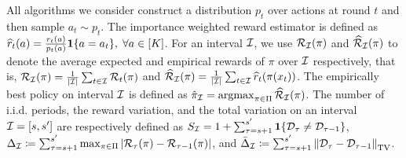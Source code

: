 
All algorithms we consider construct a distribution $p_t$ over actions
at round $t$ and then sample $a_t \sim p_t$.  The importance weighted
reward estimator is defined as $\widehat{r}_t(a) = \frac{r_t(a)}{p_t(a)}
\boldsymbol{1}\{a = a_t\},\; \forall a \in [K]$.  For an interval ${\mathcal{I}}$, we
use ${\mathcal{R}}_{\mathcal{I}}(\pi)$ and $\widehat{\cal{R}}_{\mathcal{I}}(\pi)$ to denote the average
expected and empirical rewards of $\pi$ over ${\mathcal{I}}$ respectively,
that is, ${\mathcal{R}}_{\mathcal{I}}(\pi) =
\frac{1}{|{\mathcal{I}}|}\sum_{t\in{\mathcal{I}}}{\mathcal{R}}_t(\pi)$ and $\widehat{\cal{R}}_{\mathcal{I}}(\pi) =
\frac{1}{|{\mathcal{I}}|}\sum_{t\in{\mathcal{I}}}\widehat{r}_t(\pi(x_t))$.  
The empirically best policy on interval ${\mathcal{I}}$ is defined as $\hat{\pi}_{\mathcal{I}} = \operatorname*{argmax}_{\pi\in\Pi}\widehat{\cal{R}}_{\mathcal{I}}(\pi)$.
The number of i.i.d. periods, the reward variation, and the total variation on an interval
${\mathcal{I}} = [s,s']$ are respectively defined as 
$S_{\mathcal{I}} = 1+\sum_{\tau=s+1}^{s'} \boldsymbol{1}\{{\mathcal{D}}_\tau \neq {\mathcal{D}}_{\tau-1}\}$,
$\Delta_{\mathcal{I}} \coloneqq \sum_{\tau = s+1}^{s'} \max_{\pi \in \Pi} |{\mathcal{R}}_\tau(\pi) - {\mathcal{R}}_{\tau - 1}(\pi)|$,
and $\bar{\Delta}_{\mathcal{I}} \coloneqq \sum_{\tau = s+1}^{s'}\left\|{{\mathcal{D}}_{\tau}-{\mathcal{D}}_{\tau-1}}\right\|_\text{TV}$.

